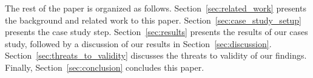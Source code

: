 
The rest of the paper is organized as follows. Section~\ref{sec:related_work} presents the background and related work to this paper. Section~\ref{sec:case_study_setup} presents the case study step. Section~\ref{sec:results} presents the results of our cases study, followed by a discussion of our results in Section~\ref{sec:discussion}. Section~\ref{sec:threats_to_validity} discusses the threats to validity of our findings. Finally, Section~\ref{sec:conclusion} concludes this paper.
